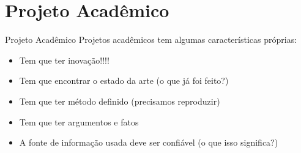 \section{Projeto Acadêmico}

\begin{frame}
	\begin{block}{Projeto Acadêmico}
		Projetos acadêmicos tem algumas características próprias:
		\begin{itemize}
			\item Tem que ter inovação!!!!
			\item Tem que encontrar o estado da arte (o que já foi feito?)
			\item Tem que ter método definido (precisamos reproduzir)
			\item Tem que ter argumentos e fatos
			\item A fonte de informação usada deve ser confiável (o que isso significa?)
		\end{itemize}
	\end{block}
\end{frame}
